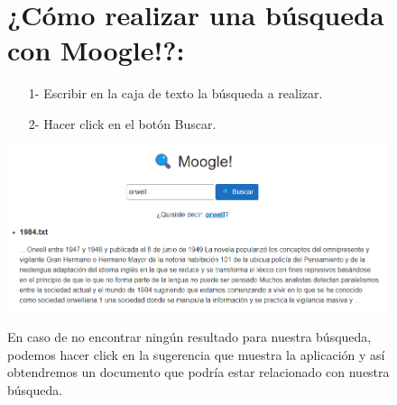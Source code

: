 \documentclass{article}
\begin{document}
\begin{figure}
	\section*{¿Cómo realizar una búsqueda con Moogle!?:}
	\begin{itemize}
		\item[1-] Escribir en la caja de texto la búsqueda a realizar.
		\item[2-] Hacer click en el botón Buscar.
	\end{itemize}

	\includegraphics*[width=16.5cm]{images/search.jpg}
	\begin{flushleft}
		En caso de no encontrar ningún resultado para nuestra búsqueda, podemos hacer click
		en la sugerencia que muestra la aplicación y así obtendremos un documento que podría
		estar relacionado con nuestra búsqueda.

	\end{flushleft}
\end{figure}
\end{document}
